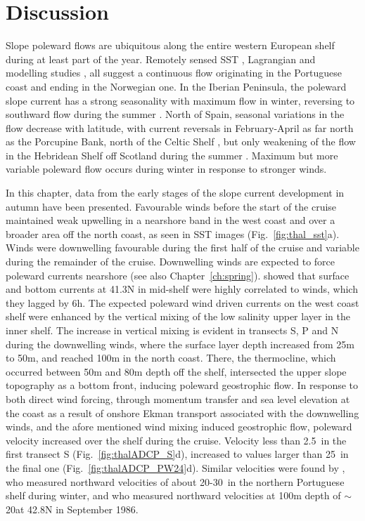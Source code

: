 \section{Discussion}
Slope poleward flows are ubiquitous along the entire western
European shelf during at least part of the year. Remotely sensed
SST \citep[e.g.][]{Pingree90}, Lagrangian
\citep[e.g.][]{VanAken02,Pingree93a} and modelling studies
\citep[e.g.][]{Coelho02,New01}, all suggest a continuous flow
originating in the Portuguese coast and ending in the Norwegian
one. In the Iberian Peninsula, the poleward slope current has a
strong seasonality with maximum flow in winter, reversing to
southward flow during the summer
\citep[e.g.][]{Haynes90,Huthnance02}. North of Spain, seasonal
variations in the flow decrease with latitude, with current
reversals in February-April as far north as the Porcupine Bank,
north of the Celtic Shelf \citep{Pingree90}, but only weakening of
the flow in the Hebridean Shelf off Scotland during the summer
\citep{Souza01}. Maximum but more variable poleward flow occurs
during winter in response to stronger winds.

In this chapter, data from the early stages of the slope current
development in autumn have been presented. Favourable winds before
the start of the cruise maintained weak upwelling in a nearshore
band in the west coast and over a broader area off the north
coast, as seen in SST images (Fig.~\ref{fig:thal_sst}a). Winds
were downwelling favourable during the first half of the cruise
and variable during the remainder of the cruise. Downwelling winds
are expected to force poleward currents nearshore (see also
Chapter~\ref{ch:spring}). \citet{Vitorino02} showed that surface
and bottom currents at 41.3\deg N in mid-shelf were highly
correlated to winds, which they lagged by 6h. The expected
poleward wind driven currents on the west coast shelf were
enhanced by the vertical mixing of the low salinity upper layer in
the inner shelf. The increase in vertical mixing is evident in
transects S, P and N during the downwelling winds, where the
surface layer depth increased from 25m to 50m, and reached 100m in
the north coast. There, the thermocline, which occurred between
50m and 80m depth off the shelf, intersected the upper slope
topography as a bottom front, inducing poleward geostrophic flow.
In response to both direct wind forcing, through momentum transfer
and sea level elevation at the coast as a result of onshore Ekman
transport associated with the downwelling winds, and the afore
mentioned wind mixing induced geostrophic flow, poleward velocity
increased over the shelf during the cruise. Velocity less than
2.5\velc\, in the first transect S (Fig.~\ref{fig:thalADCP_S}d),
increased to values larger than 25\velc\, in the final one
(Fig.~\ref{fig:thalADCP_PW24}d). Similar velocities were found by
\citet{Vitorino02}, who measured northward velocities of about
20-30\velc\, in the northern Portuguese shelf during winter, and
\citet{Haynes90} who measured northward velocities at 100m depth
of $\sim$20\velc at 42.8\deg N in September 1986.

